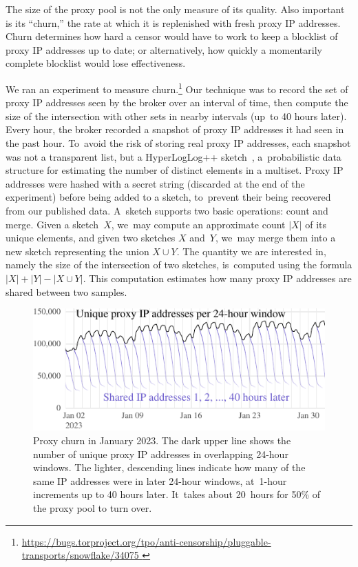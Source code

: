 \documentclass[letterpaper,twocolumn]{article}
\newlength{\urlfootnotesize}
\newcommand{\urlfootnote}[1]{\footnote{
\raggedright\hangindent\footnotemargin%
\fontsize{\urlfootnotesize}{\urlfootnotesize}\selectfont%
\url{#1}
}}
\begin{document}
The size of the proxy pool is not the only measure of its quality.
Also important is its ``churn,'' the rate at which
it is replenished with fresh proxy IP addresses.
Churn determines how hard a censor would have to work
to keep a blocklist of proxy IP addresses up to date;
or alternatively,
how quickly a momentarily complete blocklist
would lose effectiveness.

We ran an experiment to measure churn.\urlfootnote{
https://bugs.torproject.org/tpo/anti-censorship/pluggable-transports/snowflake/34075
}
Our technique was to record the set of proxy IP addresses
seen by the broker over an interval of time,
then compute the size of the intersection with other sets
in nearby intervals (up~to 40 hours later).
Every hour, the broker recorded a snapshot of
proxy IP addresses it had seen in the past hour.
To~avoid the risk of storing real proxy IP addresses,
each snapshot was not a transparent list,
but a HyperLogLog++ sketch~\cite{Heule2013a},
a~probabilistic data structure for estimating
the number of distinct elements in a multiset.
Proxy IP addresses were hashed with a secret string
(discarded at the end of the experiment)
before being added to a sketch,
to~prevent their being recovered from our published data.
A~sketch supports two basic operations: count and merge.
Given a sketch~\(X\),
we~may compute an approximate count \(|X|\)
of its unique elements,
and given two sketches \(X\) and~\(Y\),
we~may merge them into a new sketch
representing the union \(X \cup Y\).
The quantity we are interested in,
namely
the size of the intersection of two sketches,
is~computed using the formula
\(|X| + |Y| - |X \cup Y|\).
This computation estimates
how many proxy IP addresses are shared between
two samples.

\begin{figure}
\includegraphics{figures/proxy-churn/proxy-count-decay}
\caption{
Proxy churn in January 2023.
The dark upper line shows the number
of unique proxy IP addresses in overlapping 24-hour windows.
The lighter, descending lines indicate
how many of the same IP addresses were in later 24-hour windows,
at~1-hour increments up to 40 hours later.
It~takes about 20~hours for 50\% of the proxy pool to turn over.
}
\label{fig:proxy-count-decay}
\end{figure}
\end{document}
